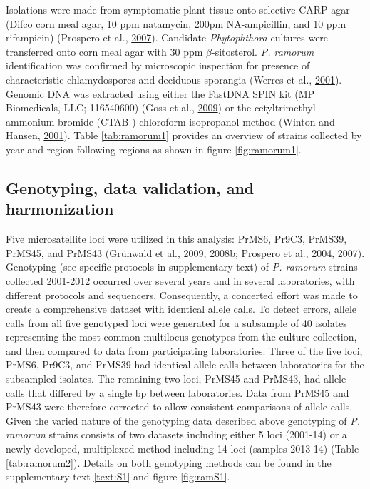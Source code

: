 \documentclass[double,12pt]{beavtex}
\begin{document}
  Isolations were made from symptomatic plant tissue onto selective CARP
  agar (Difco corn meal agar, 10 ppm natamycin, 200pm NA-ampicillin, and
  10 ppm rifampicin) (Prospero et al.,
  \protect\hyperlink{ref-prospero2007population}{2007}). Candidate
  \emph{Phytophthora} cultures were transferred onto corn meal agar with
  30 ppm \(\beta\)-sitosterol. \emph{P. ramorum} identification was
  confirmed by microscopic inspection for presence of characteristic
  chlamydospores and deciduous sporangia (Werres et al.,
  \protect\hyperlink{ref-werres2001phytophthora}{2001}). Genomic DNA was
  extracted using either the FastDNA SPIN kit (MP Biomedicals, LLC;
  116540600) (Goss et al.,
  \protect\hyperlink{ref-goss2009population}{2009}) or the cetyltrimethyl
  ammonium bromide (CTAB )-chloroform-isopropanol method (Winton and
  Hansen, \protect\hyperlink{ref-winton2001molecular}{2001}). Table
  \ref{tab:ramorum1} provides an overview of strains collected by year and
  region following regions as shown in figure \ref{fig:ramorum1}.
  
  \subsection{Genotyping, data validation, and
  harmonization}\label{genotyping-data-validation-and-harmonization}
  
  Five microsatellite loci were utilized in this analysis: PrMS6, Pr9C3,
  PrMS39, PrMS45, and PrMS43 (Grünwald et al.,
  \protect\hyperlink{ref-grunwald2009standardizing}{2009},
  \protect\hyperlink{ref-grunwald2008susceptibility}{2008}\protect\hyperlink{ref-grunwald2008susceptibility}{b};
  Prospero et al., \protect\hyperlink{ref-prospero2004isolation}{2004},
  \protect\hyperlink{ref-prospero2007population}{2007}). Genotyping (see
  specific protocols in supplementary text) of \emph{P. ramorum} strains
  collected 2001-2012 occurred over several years and in several
  laboratories, with different protocols and sequencers. Consequently, a
  concerted effort was made to create a comprehensive dataset with
  identical allele calls. To detect errors, allele calls from all five
  genotyped loci were generated for a subsample of 40 isolates
  representing the most common multilocus genotypes from the culture
  collection, and then compared to data from participating laboratories.
  Three of the five loci, PrMS6, Pr9C3, and PrMS39 had identical allele
  calls between laboratories for the subsampled isolates. The remaining
  two loci, PrMS45 and PrMS43, had allele calls that differed by a single
  bp between laboratories. Data from PrMS45 and PrMS43 were therefore
  corrected to allow consistent comparisons of allele calls. Given the
  varied nature of the genotyping data described above genotyping of
  \emph{P. ramorum} strains consists of two datasets including either 5
  loci (2001-14) or a newly developed, multiplexed method including 14
  loci (samples 2013-14) (Table \ref{tab:ramorum2}). Details on both
  genotyping methods can be found in the supplementary text \ref{text:S1}
  and figure \ref{fig:ramS1}.
  
\end{document}
